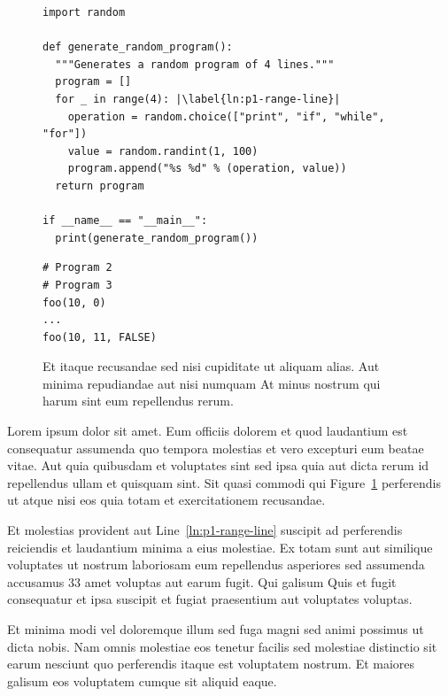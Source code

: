 \begin{figure}
    \begin{minipage}{0.48\textwidth}
        \begin{lstlisting}[style=code]
import random

def generate_random_program():
  """Generates a random program of 4 lines."""
  program = []
  for _ in range(4): |\label{ln:p1-range-line}|
    operation = random.choice(["print", "if", "while", "for"])
    value = random.randint(1, 100)
    program.append("%s %d" % (operation, value))
  return program

if __name__ == "__main__":
  print(generate_random_program())
        \end{lstlisting}        
    \end{minipage}
    \begin{minipage}{0.48\textwidth}
        \begin{lstlisting}[style=code,firstnumber=1]
# Program 2
# Program 3
foo(10, 0)
...
foo(10, 11, FALSE)
        \end{lstlisting}
    \end{minipage}
\footnotesize
    \caption{Et itaque recusandae sed nisi cupiditate ut aliquam alias. Aut minima repudiandae aut nisi numquam At minus nostrum qui harum sint eum repellendus rerum.}
    \label{fig:aa-example}
\end{figure}

Lorem ipsum dolor sit amet. Eum officiis dolorem et quod laudantium est consequatur assumenda quo tempora molestias et vero excepturi eum beatae vitae. Aut quia quibusdam et voluptates sint sed ipsa quia aut dicta rerum id repellendus ullam et quisquam sint. Sit quasi commodi qui Figure~\ref{fig:aa-example} perferendis ut atque nisi eos quia totam et exercitationem recusandae. 

Et molestias provident aut Line~\ref{ln:p1-range-line} suscipit ad perferendis reiciendis et laudantium minima a eius molestiae. Ex totam sunt aut similique voluptates ut nostrum laboriosam eum repellendus asperiores sed assumenda accusamus 33 amet voluptas aut earum fugit. Qui galisum Quis et fugit consequatur et ipsa suscipit et fugiat praesentium aut voluptates voluptas.

Et minima modi vel doloremque illum sed fuga magni sed animi possimus ut dicta nobis. Nam omnis molestiae eos tenetur facilis sed molestiae distinctio sit earum nesciunt quo perferendis itaque est voluptatem nostrum. Et maiores galisum eos voluptatem cumque sit aliquid eaque. 


